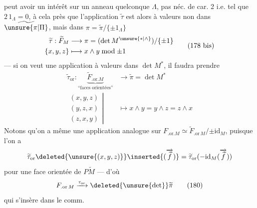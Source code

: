 peut avoir un intérêt sur un anneau quelconque $\Lambda$, pas néc. de car. 2 i.e. tel que $2\,1_\Lambda=0$, à cela près que l'application $\widetilde\tau$ est alors à valeurs non dans $\widetilde{\unsure{\pi|\Pi}}$, mais dans $\pi=\widetilde\pi/\{\pm1_\Lambda\}$
\[
\begin{aligned}
 \widetilde\tau:\widetilde F_M&\longrightarrow\pi=(\det M^{\unsure{*|\wedge}})/\{\pm1\}\\
 \{x,y,z\}&\longmapsto x\wedge y\bmod\pm1
\end{aligned}\tag*{(178 bis)}
\]
--- si on veut une application à valeurs dans $\det M^*$, il faudra prendre
\[
\begin{aligned}
 \widetilde\tau_{\mathrm{or}}:\underbrace{\widetilde F_{.\mathrm{or}.M}}_{\text{``faces orientées''}}&
 \longrightarrow\widetilde\pi=\det M^*\\
 \left.\begin{gathered}(x,y,z)\\(y,z,x)\\(z,x,y)\end{gathered}\right|&\longmapsto x\wedge y=y\wedge z=z\wedge x
\end{aligned}\tag*{(179)}
\]
Notons qu'on a même une application analogue sur $F_{.\mathrm{or}.M}\simeq\widetilde F_{.\mathrm{or}\,M}/{\pm\mathrm{id}_M}$, puisque l'on a
\[
 \widetilde\tau_{\mathrm{or}}\deleted{\unsure{(x,y,z)}}\inserted{(\overrightarrow{\widetilde f})}
 =\widetilde\tau_{\mathrm{or}}(-\mathrm{id}_M(\overrightarrow{\widetilde f}))
\]
pour une face orientée de $P\widetilde M$ --- d'où
\[
 F_{.\mathrm{or}\,M}\xrightarrow{\tau_{\mathrm{or}}}\deleted{\unsure{\det}}\widetilde\pi\tag*{(180)}
\]
qui  s'insère dans le  comm.
